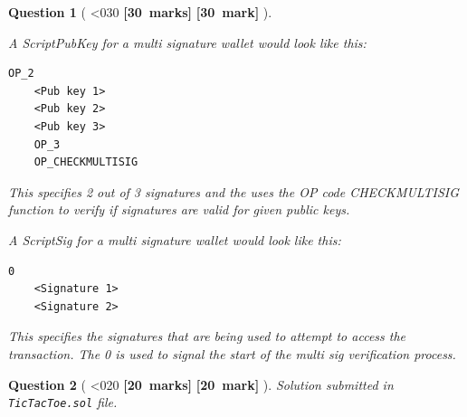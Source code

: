 \documentclass[a4paper]{article}
\theoremstyle{que}
\newtheorem{question}{Question}
\newcommand\points[1]{%
\ifnum1<0#1\relax%
    {\bf \small [#1~marks]}%
  \else%
    {\bf \small [#1~mark]}%
  \fi%
}%
\begin{document}
\begin{question}[\points{30}]
\begin{enumerate}[label=(\alph*)]
    A ScriptPubKey for a multi signature wallet would look like this:
    \begin{lstlisting}[basicstyle=\ttfamily, breaklines=true]
    OP_2 
    <Pub key 1>
    <Pub key 2>
    <Pub key 3>
    OP_3
    OP_CHECKMULTISIG
    \end{lstlisting}
    This specifies 2 out of 3 signatures and the uses the OP code CHECKMULTISIG function to verify if signatures are valid for given public keys.

    A ScriptSig for a multi signature wallet would look like this:
    \begin{lstlisting}[basicstyle=\ttfamily, breaklines=true]
    0
    <Signature 1>
    <Signature 2>
    \end{lstlisting}
    This specifies the signatures that are being used to attempt to access the transaction. The 0 is used to signal the start of the multi sig verification process.
  \end{enumerate}
\end{question}

\newpage


\begin{question}[\points{20}]
  Solution submitted in {\tt TicTacToe.sol} file.
\end{question}

\newpage
\printbibliography
\end{document}
